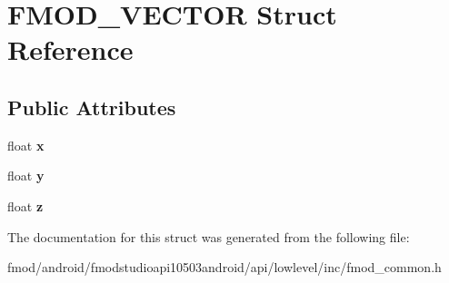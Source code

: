 \hypertarget{struct_f_m_o_d___v_e_c_t_o_r}{\section{F\+M\+O\+D\+\_\+\+V\+E\+C\+T\+O\+R Struct Reference}
\label{struct_f_m_o_d___v_e_c_t_o_r}
}
\subsection*{Public Attributes}
\begin{DoxyCompactItemize}
\item 
\hypertarget{struct_f_m_o_d___v_e_c_t_o_r_afe9fad8ce812c3cfc021c25bbb8bc0e8}{float {\bfseries x}}\label{struct_f_m_o_d___v_e_c_t_o_r_afe9fad8ce812c3cfc021c25bbb8bc0e8}

\item 
\hypertarget{struct_f_m_o_d___v_e_c_t_o_r_abea7feb26ece298baa766f821b8686ff}{float {\bfseries y}}\label{struct_f_m_o_d___v_e_c_t_o_r_abea7feb26ece298baa766f821b8686ff}

\item 
\hypertarget{struct_f_m_o_d___v_e_c_t_o_r_ab64088b1bd2e695bd1abc6b370b71796}{float {\bfseries z}}\label{struct_f_m_o_d___v_e_c_t_o_r_ab64088b1bd2e695bd1abc6b370b71796}

\end{DoxyCompactItemize}


The documentation for this struct was generated from the following file\+:\begin{DoxyCompactItemize}
\item 
fmod/android/fmodstudioapi10503android/api/lowlevel/inc/fmod\+\_\+common.\+h\end{DoxyCompactItemize}
